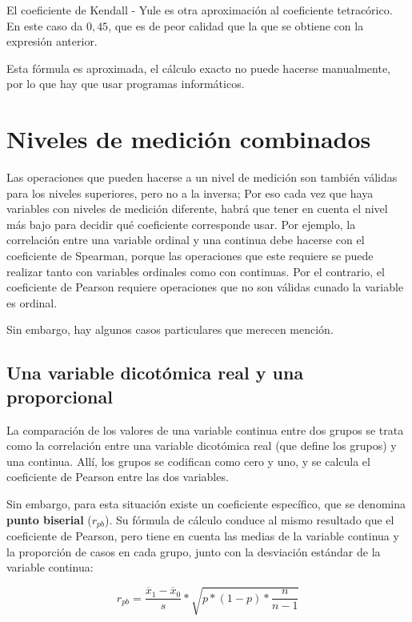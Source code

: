 \documentclass[]{book}
\begin{document}
El coeficiente de Kendall - Yule es otra aproximación al coeficiente
tetracórico. En este caso da \(0,45\), que es de peor calidad que la que se obtiene con la expresión anterior.

Esta fórmula es aproximada, el cálculo exacto no puede hacerse
manualmente, por lo que hay que usar programas informáticos.

\hypertarget{niveles-de-medicion-combinados}{%
\section{Niveles de medición combinados}\label{niveles-de-medicion-combinados}}

Las operaciones que pueden hacerse a un nivel de medición
son también válidas para los niveles superiores, pero no a la inversa; Por eso cada vez que haya variables con niveles de medición diferente, habrá que tener en cuenta el nivel más bajo para decidir qué coeficiente corresponde usar. Por ejemplo, la correlación entre una variable ordinal y una continua debe hacerse con el coeficiente de Spearman, porque las operaciones que este requiere se puede realizar tanto con variables ordinales como con continuas. Por el contrario, el coeficiente de Pearson requiere operaciones que no son válidas cunado la variable es ordinal.

Sin embargo, hay algunos casos particulares que merecen mención.

\hypertarget{una-variable-dicotomica-real-y-una-proporcional}{%
\subsection{Una variable dicotómica real y una proporcional}\label{una-variable-dicotomica-real-y-una-proporcional}}

La comparación de los valores de una variable continua entre dos grupos se trata como la correlación entre una variable dicotómica real (que define los grupos) y una continua. Allí, los grupos se codifican como cero y uno, y se calcula el coeficiente de Pearson entre las dos variables.

Sin embargo, para esta situación existe un coeficiente específico, que se denomina \textbf{punto biserial} (\(r_{pb}\)). Su fórmula de cálculo conduce al mismo resultado que el coeficiente de Pearson, pero tiene en cuenta las medias de la variable continua y la proporción de casos en cada grupo, junto con la desviación estándar de la variable continua:

\[r_{pb} = \frac{{\overline{x}}_{1} - {\overline{x}}_{0}}{s}*\sqrt{p*(1 - p)*\frac{n}{n - 1}}\]
\end{document}

